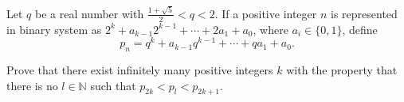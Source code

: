 Let $q$ be a real number with $\frac{1+\sqrt{5}}{2} < q < 2$. If a positive integer $n$ is represented in binary system as $2^k+a_{k-1}2^{k-1}+\cdots +2a_1+a_0$, where $a_i\in\{0,1\}$, define\[p_n=q^k+a_{k-1}q^{k-1}+\cdots +qa_1+a_0. \]

Prove that there exist infinitely many positive integers $k$ with the property that there is no $l\in\mathbb{N}$ such that $p_{2k} < p_l < p_{2k+1}$.
